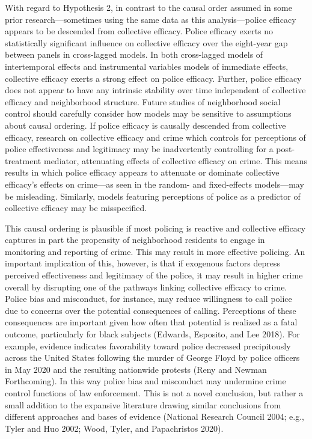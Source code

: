 \documentclass [11pt, proquest] {uwthesis}[2015/03/03]
\begin{document}
With regard to Hypothesis 2, in contrast to the causal order assumed in some prior research---sometimes using the same data as this analysis---police efficacy appears to be descended from collective efficacy. Police efficacy exerts no statistically significant influence on collective efficacy over the eight-year gap between panels in cross-lagged models. In both cross-lagged models of intertemporal effects and instrumental variables models of immediate effects, collective efficacy exerts a strong effect on police efficacy. Further, police efficacy does not appear to have any intrinsic stability over time independent of collective efficacy and neighborhood structure. Future studies of neighborhood social control should carefully consider how models may be sensitive to assumptions about causal ordering. If police efficacy is causally descended from collective efficacy, research on collective efficacy and crime which controls for perceptions of police effectiveness and legitimacy may be inadvertently controlling for a post-treatment mediator, attenuating effects of collective efficacy on crime. This means results in which police efficacy appears to attenuate or dominate collective efficacy's effects on crime---as seen in the random- and fixed-effects models---may be misleading. Similarly, models featuring perceptions of police as a predictor of collective efficacy may be misspecified.

This causal ordering is plausible if most policing is reactive and collective efficacy captures in part the propensity of neighborhood residents to engage in monitoring and reporting of crime. This may result in more effective policing. An important implication of this, however, is that if exogenous factors depress perceived effectiveness and legitimacy of the police, it may result in higher crime overall by disrupting one of the pathways linking collective efficacy to crime. Police bias and misconduct, for instance, may reduce willingness to call police due to concerns over the potential consequences of calling. Perceptions of these consequences are important given how often that potential is realized as a fatal outcome, particularly for black subjects (Edwards, Esposito, and Lee 2018). For example, evidence indicates favorability toward police decreased precipitously across the United States following the murder of George Floyd by police officers in May 2020 and the resulting nationwide protests (Reny and Newman Forthcoming). In this way police bias and misconduct may undermine crime control functions of law enforcement. This is not a novel conclusion, but rather a small addition to the expansive literature drawing similar conclusions from different approaches and bases of evidence (National Research Council 2004; e.g., Tyler and Huo 2002; Wood, Tyler, and Papachristos 2020).
\end{document}
